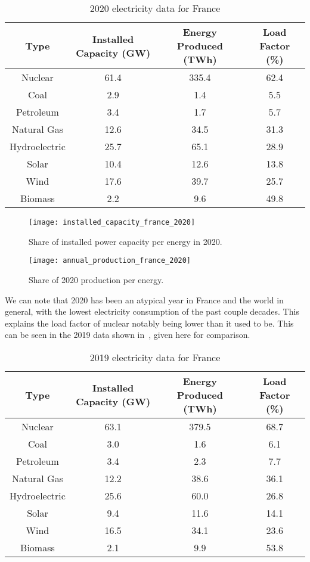 \begin{table*}[ht]
\caption[2020 electricity data for France]{2020 electricity data for France}
\begin{tabular}{ c c c c }
	\toprule
	Type & Installed Capacity (GW) & Energy Produced (TWh) & Load Factor (\%) \\
	\midrule
	Nuclear & 61.4 & 335.4 & 62.4\\
	Coal & 2.9 & 1.4 & 5.5\\
	Petroleum & 3.4 & 1.7 & 5.7\\
	Natural Gas & 12.6 & 34.5 & 31.3\\
	Hydroelectric & 25.7 & 65.1 & 28.9\\
	Solar & 10.4 & 12.6 & 13.8\\
	Wind & 17.6 & 39.7 & 25.7\\
	Biomass & 2.2 & 9.6 & 49.8\\
	\bottomrule
\end{tabular}
\end{table*}


\begin{figure}[h]
	\texttt{[image: installed\_capacity\_france\_2020]}
	\caption[Share of installed power capacity per energy]{Share of installed power capacity per energy in 2020.}
\end{figure}


\begin{figure}[h]
	\texttt{[image: annual\_production\_france\_2020]}
	\caption[Share of 2020 production per energy]{Share of 2020 production per energy.}
\end{figure}



We can note that 2020 has been an atypical year in France and the world in general, with the lowest electricity consumption of the past couple decades. This explains the load factor of nuclear notably being lower than it used to be. This can be seen in the 2019 data shown in~, given here for comparison.

\begin{table*}[ht]
\caption[2019 electricity data for France]{2019 electricity data for France}
\begin{tabular}{ c c c c }
	\toprule
	Type & Installed Capacity (GW) & Energy Produced (TWh) & Load Factor (\%) \\
	\midrule
	Nuclear & 63.1 & 379.5 & 68.7\\
	Coal & 3.0 & 1.6 & 6.1\\
	Petroleum & 3.4 & 2.3 & 7.7\\
	Natural Gas & 12.2 & 38.6 & 36.1\\
	Hydroelectric & 25.6 & 60.0 & 26.8\\
	Solar & 9.4 & 11.6 & 14.1\\
	Wind & 16.5 & 34.1 & 23.6\\
	Biomass & 2.1 & 9.9 & 53.8\\
	\bottomrule
\end{tabular}
\end{table*}



